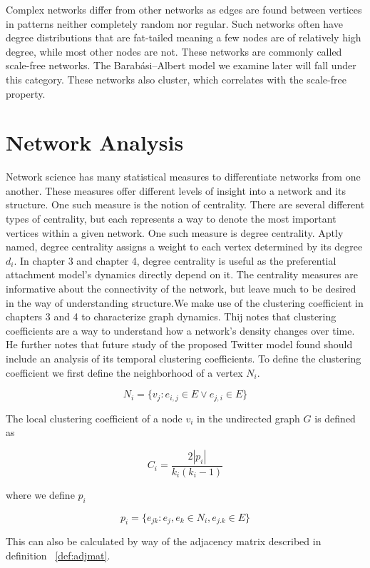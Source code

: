 Complex networks differ from other networks as edges are found between vertices 
in patterns neither completely random nor regular. Such networks often have degree distributions that are fat-tailed
meaning a few nodes are of relatively high degree, while most other nodes are not. These networks
are commonly called scale-free networks. The Barabási–Albert model we examine later will fall under
this category. These networks also cluster, which correlates with the scale-free 
property. 

\section{Network Analysis}
\label{section:Network Analysis}
Network science has many statistical measures to differentiate networks from one another. These
measures offer different levels of insight into a network and its structure.
One such measure is the notion of centrality. There are several different types
of centrality, but each represents a way to denote the most important vertices within a 
given network. One such measure is degree centrality. Aptly named, degree centrality 
assigns a weight to each vertex determined by its degree $d_i$. In chapter 3 and chapter 4, degree
centrality is useful as the preferential attachment model's dynamics directly depend on it. The centrality 
measures are informative about the connectivity of the network, but leave much to be desired in the way 
of understanding structure.We make use of the clustering coefficient in chapters 3 and 4 to characterize graph dynamics. Thij \cite{thij}
notes that clustering coefficients are a way to understand how a network's density changes over time. He 
further notes that future study of the proposed Twitter model found should include an analysis of its temporal clustering coefficients.
To define the clustering coefficient we first define the neighborhood of a vertex $N_i$.

$$
N_i = \{v_j: e_{i,j}\in E \lor e_{j,i} \in E\}
$$

\noindent The local clustering coefficient of a node $v_i$ in the undirected graph $G$ is defined as 

$$
C_i = \frac{2|p_i|}{k_i(k_i-1)}
$$

\noindent where we define $p_i$

$$
p_i = \{ e_{jk}: e_j, e_k \in N_i, e_{j.k}\in E\}
$$

\noindent This can also be calculated by way of the adjacency matrix described in definition ~\ref{def:adjmat}.

